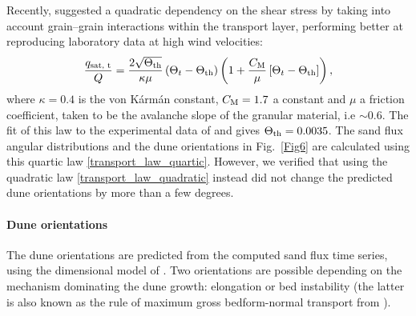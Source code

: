 Recently, \citet{Pahtz2020} suggested a quadratic dependency on the shear stress by taking into account grain--grain interactions within the transport layer, performing better at reproducing laboratory data at high wind velocities:
\begin{equation}
  \label{transport_law_quartic}
  \frac{q_{\textup{sat, t}}}{Q} = \frac{2\sqrt{\Theta_{\textup{th}}}}{\kappa\mu}\left(\Theta_{t} - \Theta_{\textup{th}}\right)\left(1 +\frac{C_{\textup{M}}}{\mu}\left[\Theta_{t} - \Theta_{\textup{th}}\right]\right),
\end{equation}
where $\kappa = 0.4$ is the von Kármán constant, $C_{\rm M}=1.7$ a constant and $\mu$ a friction coefficient, taken to be the avalanche slope of the granular material, i.e $\sim 0.6$. The fit of this law to the experimental data of \citet{Creyssels2009} and \citet{Ho2011} gives $\Theta_{\textup{th}} = 0.0035$. The sand flux angular distributions and the dune orientations in Fig.~\ref{Fig6} are calculated using this quartic law \eqref{transport_law_quartic}. However, we verified that using the quadratic law \eqref{transport_law_quadratic} instead did not change the predicted dune orientations by more than a few degrees.

\paragraph{Dune orientations}

The dune orientations are predicted from the computed sand flux time series, using the dimensional model of \citet{Courrech2014}. Two orientations are possible depending on the mechanism dominating the dune growth: elongation or bed instability (the latter is also known as the rule of maximum gross bedform-normal transport from \citet{Rubin1987}).

